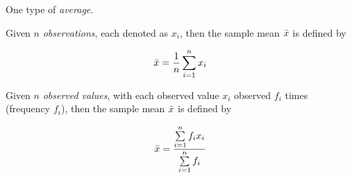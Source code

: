 \begin{definition}[Mean]
    One type of \textit{average}.
    
    Given $n$ \textit{observations}, each denoted as $x_i$, then the sample mean $\Bar{x}$ is defined by
    
    \begin{equation}\label{eq:mean}
        \Bar{x} = \frac{1}{n} \sum \limits_{i=1}^{n} x_i
    \end{equation}
    
    Given $n$ \textit{observed values}, with each observed value $x_i$ observed $f_i$ times (frequency $f_i$), then the sample mean $\Bar{x}$ is defined by
    
    \begin{equation}\label{eq:mean_freq}
        \Bar{x} = \frac{
            \sum \limits_{i=1}^{n} f_i x_i
        }{
            \sum \limits_{i=1}^{n} f_i
        }
    \end{equation}
\end{definition}
